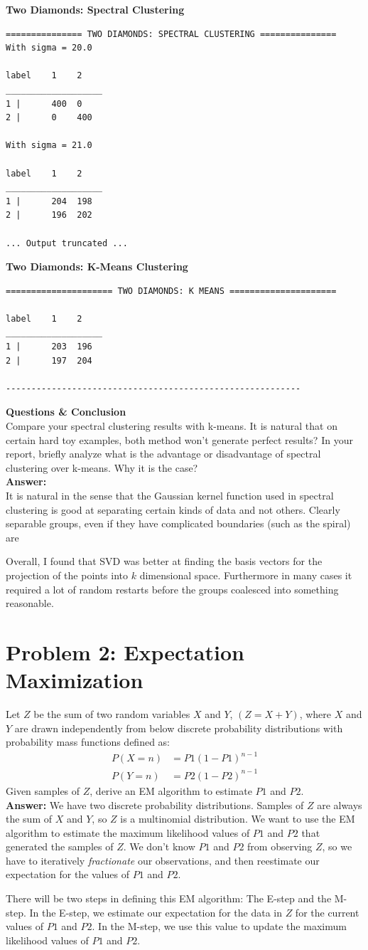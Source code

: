 \documentclass[11pt]{article}
\begin{document}
\textbf{Two Diamonds: Spectral Clustering} 
\begin{verbatim}
=============== TWO DIAMONDS: SPECTRAL CLUSTERING ===============
With sigma = 20.0

label    1    2    
___________________
1 |      400  0    
2 |      0    400    

With sigma = 21.0

label    1    2    
___________________
1 |      204  198    
2 |      196  202    

... Output truncated ... 	

\end{verbatim}
\textbf{Two Diamonds: K-Means Clustering} 
\begin{verbatim}
===================== TWO DIAMONDS: K MEANS =====================

label    1    2    
___________________
1 |      203  196    
2 |      197  204    

----------------------------------------------------------
\end{verbatim}
\textbf{Questions \& Conclusion}
\\[5pt]
Compare your spectral clustering results with k-means. It is natural that on certain hard toy examples, both method won't generate perfect results? In your report, briefly analyze what is the advantage or disadvantage of spectral clustering over k-means. Why it is the case? 
\\[5pt]\textbf{Answer:}\\[5pt]
It is natural in the sense that the Gaussian kernel function used in spectral clustering is good at separating certain kinds of data and not others. Clearly separable groups, even if they have complicated boundaries (such as the spiral) are

Overall, I found that SVD was better at finding the basis vectors for the projection of the points into $k$ dimensional space. Furthermore in many cases it required a lot of random restarts before the groups coalesced into something reasonable. 
\section*{Problem 2: Expectation Maximization}

Let $Z$ be the sum of two random variables $X$ and $Y$, $(Z=X+Y)$, where $X$ and $Y$ are drawn independently from below discrete probability distributions with probability mass functions defined as:
\begin{align}
P(X=n) &= P1(1-P1)^{n-1}\\
P(Y=n) &= P2(1-P2)^{n-1}
\end{align}
Given samples of $Z$, derive an EM algorithm to estimate $P1$ and $P2$.
\\[5pt]\textbf{Answer:}
We have two discrete probability distributions. Samples of $Z$ are always the sum of $X$ and $Y$, so $Z$ is a multinomial distribution. We want to use the EM algorithm to estimate the maximum likelihood values of $P1$ and $P2$ that generated the samples of $Z$. We don't know $P1$ and $P2$ from observing $Z$, so we have to iteratively \textit{fractionate} our observations, and then reestimate our expectation for the values of $P1$ and $P2$.

There will be two steps in defining this EM algorithm: The E-step and the M-step. In the E-step, we estimate our expectation for the data in $Z$ for the current values of $P1$ and $P2$. In the M-step, we use this value to update the maximum likelihood values of $P1$ and $P2$.
\end{document}
